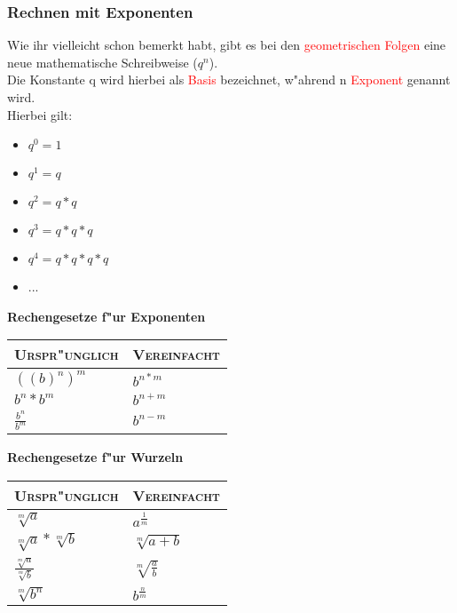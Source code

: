 \subsubsection{Rechnen mit Exponenten}
Wie ihr vielleicht schon bemerkt habt, gibt es bei den \textcolor{red}{geometrischen Folgen} eine neue mathematische Schreibweise ($q^n$).\\
Die Konstante q wird hierbei als \textcolor{red}{Basis} bezeichnet, w"ahrend n \textcolor{red}{Exponent} genannt wird.\\
Hierbei gilt:\\
\begin{itemize}
\item $q^0 = 1$
\item $q^1 = q$
\item $q^2 = q*q$
\item $q^3 = q*q*q$
\item $q^4 = q*q*q*q$
\item ...
\end{itemize}

\begin{center}
\textbf{Rechengesetze f"ur Exponenten}\\
\end{center}
\begin{tabular}{|>{\centering\arraybackslash}p{6.5 cm}|>{\centering\arraybackslash}p{6.5 cm}|}
\hline
\textsc{Urspr"unglich}&\textsc{Vereinfacht}\\
\hline
$((b)^n)^m$&$b^{n*m}$\\
\hline
$b^n * b^m$&$b^{n+m}$\\
\hline
$\frac{b^n}{b^m}$&$b^{n-m}$\\
\hline
\end{tabular}

\begin{center}
\textbf{Rechengesetze f"ur Wurzeln}
\end{center}
\begin{tabular}{|>{\centering\arraybackslash}p{6.5 cm}|>{\centering\arraybackslash}p{6.5 cm}|}
\hline
\textsc{Urspr"unglich}&\textsc{Vereinfacht}\\
\hline
$\sqrt[m]{a}$&$a^{\frac{1}{m}}$\\
\hline
$\sqrt[m]{a}*\sqrt[m]{b}$&$\sqrt[m]{a+b}$\\
\hline
$\frac{\sqrt[m]{a}}{\sqrt[m]{b}}$&$\sqrt[m]{\frac{a}{b}}$\\
\hline
$\sqrt[m]{b^n}$&$b^{\frac{n}{m}}$\\
\hline
\end{tabular}